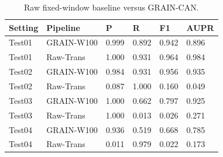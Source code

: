 \begin{table}[H]
\caption{Raw fixed-window baseline versus GRAIN-CAN.}\label{tab:rawgrain}
\centering\small
\begin{tabular}{llllll}
\hline
Setting & Pipeline & P & R & F1 & AUPR \\
\hline
Test01 & GRAIN-W100 & 0.999 & 0.892 & 0.942 & 0.896 \\
Test01 & Raw-Trans & 1.000 & 0.931 & 0.964 & 0.984 \\
Test02 & GRAIN-W100 & 0.984 & 0.931 & 0.956 & 0.935 \\
Test02 & Raw-Trans & 0.087 & 1.000 & 0.160 & 0.049 \\
Test03 & GRAIN-W100 & 1.000 & 0.662 & 0.797 & 0.925 \\
Test03 & Raw-Trans & 1.000 & 0.013 & 0.026 & 0.271 \\
Test04 & GRAIN-W100 & 0.936 & 0.519 & 0.668 & 0.785 \\
Test04 & Raw-Trans & 0.011 & 0.979 & 0.022 & 0.173 \\
\hline
\end{tabular}
\end{table}

